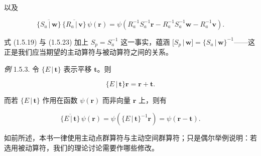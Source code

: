 以及

\begin{equation*}
\overline{\{S_{a} \,|\, \mathbf{w}\}}\,\overline{\{R_{a} \,|\, \mathbf{v}\}}\,\psi(\mathbf{r}) = \psi(R_{a}^{-1}S_{a}^{-1}\mathbf{r} - R_{a}^{-1}S_{a}^{-1}\mathbf{w} - R_{a}^{-1}\mathbf{v}).
\tag{1.5.24}
\end{equation*}

式 (1.5.19) 与 (1.5.23) 加上 $S_{p} = S_{a}^{-1}$ 这一事实，蕴涵 $[S_{p} \,|\, \mathbf{w}] = \{S_{a} \,|\, \mathbf{w}\}^{-1}$——这正是我们应当期望的主动算符与被动算符之间的关系。

\textit{例} 1.5.3. 令 $\{E \,|\, \mathbf{t}\}$ 表示平移 $\mathbf{t}$。则

\begin{equation*}
\{E \,|\, \mathbf{t}\}\mathbf{r} = \mathbf{r} + \mathbf{t}.
\tag{1.5.25}
\end{equation*}

而若 $\{E \,|\, \mathbf{t}\}$ 作用在函数 $\psi(\mathbf{r})$ 而非向量 $\mathbf{r}$ 上，则有

\begin{equation*}
\overline{\{E \,|\, \mathbf{t}\}}\,\psi(\mathbf{r}) = \psi(\{E \,|\, \mathbf{t}\}^{-1}\mathbf{r}) = \psi(\mathbf{r} - \mathbf{t}).
\tag{1.5.26}
\end{equation*}

如前所述，本书一律使用主动点群算符与主动空间群算符；只是偶尔举例说明：若选用被动算符，我们的理论讨论需要作哪些修改。
